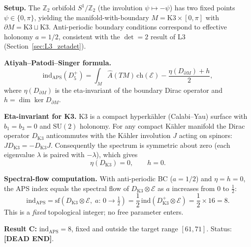 \documentclass[11pt,a4paper]{article}
\theoremstyle{definition}
\theoremstyle{remark}
\begin{document}
\textbf{Setup.}
The $\mathbb{Z}_2$ orbifold $S^1/\mathbb{Z}_2$ (the involution
$\psi\mapsto-\psi$) has two fixed points $\psi\in\{0,\pi\}$, yielding the
manifold-with-boundary $M=\mathrm{K3}\times[0,\pi]$ with
$\partial M=\mathrm{K3}\sqcup\mathrm{K3}$.
Anti-periodic boundary conditions correspond to effective holonomy $a=1/2$,
consistent with the $\det=2$ result of L3
(Section~\ref{sec:L3_zetadet}).

\textbf{Atiyah--Patodi--Singer formula.}
\begin{equation}
  \mathrm{ind}_{\mathrm{APS}}(D^+_5)
  = \int_M \hat{A}(TM)\,\mathrm{ch}(\mathcal{E})
    - \frac{\eta(D_{\partial M})+h}{2},
  \label{eq:APS_K3}
\end{equation}
where $\eta(D_{\partial M})$ is the eta-invariant of the boundary Dirac
operator and $h=\dim\ker D_{\partial M}$.

\textbf{Eta-invariant for K3.}
K3 is a compact hyperkähler (Calabi--Yau) surface with $b_1=b_3=0$
and $\mathrm{SU}(2)$ holonomy.  For any compact Kähler manifold the
Dirac operator $D_{\mathrm{K3}}$ anticommutes with the Kähler involution $J$
acting on spinors: $J D_{\mathrm{K3}} = -D_{\mathrm{K3}} J$.
Consequently the spectrum is symmetric about zero (each eigenvalue
$\lambda$ is paired with $-\lambda$), which gives
\begin{equation}
  \eta(D_{\mathrm{K3}}) = 0,\qquad h=0.
  \label{eq:eta_K3}
\end{equation}

\textbf{Spectral-flow computation.}
With anti-periodic BC ($a=1/2$) and $\eta=h=0$, the APS index equals the
spectral flow of $D_{\mathrm{K3}}\otimes\mathcal{E}$ as $a$ increases from
$0$ to $\tfrac{1}{2}$:
\begin{equation}
  \mathrm{ind}_{\mathrm{APS}}
  = \mathrm{sf}\!\left(D_{\mathrm{K3}}\otimes\mathcal{E},\;
    a:\,0\to\tfrac{1}{2}\right)
  = \frac{1}{2}\,\mathrm{ind}(D^+_{\mathrm{K3}}\otimes\mathcal{E})
  = \frac{1}{2}\times 16 = 8.
  \label{eq:APS_result}
\end{equation}
This is a \emph{fixed} topological integer; no free parameter enters.

\textbf{Result C:}
$\mathrm{ind}_{\mathrm{APS}}=8$, fixed and outside the target range
$[61,71]$.  Status: \textbf{[DEAD END]}.
\end{document}
